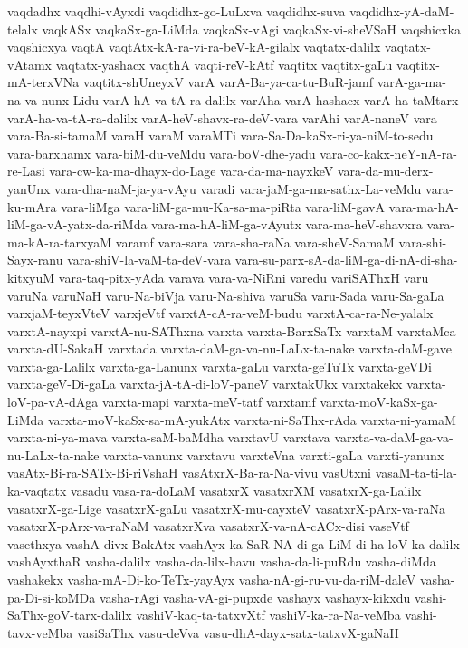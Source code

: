 {vaqdadhx
vaqdhi-vAyxdi
vaqdidhx-go-LuLxva
vaqdidhx-suva
vaqdidhx-yA-daM-telalx
vaqkASx
vaqkaSx-ga-LiMda
vaqkaSx-vAgi
vaqkaSx-vi-sheVSaH
vaqshicxka
vaqshicxya
vaqtA
vaqtAtx-kA-ra-vi-ra-beV-kA-gilalx
vaqtatx-dalilx
vaqtatx-vAtamx
vaqtatx-yashacx
vaqthA
vaqti-reV-kAtf
vaqtitx
vaqtitx-gaLu
vaqtitx-mA-terxVNa
vaqtitx-shUneyxV
varA
varA-Ba-ya-ca-tu-BuR-jamf
varA-ga-ma-na-va-nunx-Lidu
varA-hA-va-tA-ra-dalilx
varAha
varA-hashacx
varA-ha-taMtarx
varA-ha-va-tA-ra-dalilx
varA-heV-shavx-ra-deV-vara
varAhi
varA-naneV
vara
vara-Ba-si-tamaM
varaH
varaM
varaMTi
vara-Sa-Da-kaSx-ri-ya-niM-to-sedu
vara-barxhamx
vara-biM-du-veMdu
vara-boV-dhe-yadu
vara-co-kakx-neY-nA-ra-re-Lasi
vara-cw-ka-ma-dhayx-do-Lage
vara-da-ma-nayxkeV
vara-da-mu-derx-yanUnx
vara-dha-naM-ja-ya-vAyu
varadi
vara-jaM-ga-ma-sathx-La-veMdu
vara-ku-mAra
vara-liMga
vara-liM-ga-mu-Ka-sa-ma-piRta
vara-liM-gavA
vara-ma-hA-liM-ga-vA-yatx-da-riMda
vara-ma-hA-liM-ga-vAyutx
vara-ma-heV-shavxra
vara-ma-kA-ra-tarxyaM
varamf
vara-sara
vara-sha-raNa
vara-sheV-SamaM
vara-shi-Sayx-ranu
vara-shiV-la-vaM-ta-deV-vara
vara-su-parx-sA-da-liM-ga-di-nA-di-sha-kitxyuM
vara-taq-pitx-yAda
varava
vara-va-NiRni
varedu
variSAThxH
varu
varuNa
varuNaH
varu-Na-biVja
varu-Na-shiva
varuSa
varu-Sada
varu-Sa-gaLa
varxjaM-teyxVteV
varxjeVtf
varxtA-cA-ra-veM-budu
varxtA-ca-ra-Ne-yalalx
varxtA-nayxpi
varxtA-nu-SAThxna
varxta
varxta-BarxSaTx
varxtaM
varxtaMca
varxta-dU-SakaH
varxtada
varxta-daM-ga-va-nu-LaLx-ta-nake
varxta-daM-gave
varxta-ga-Lalilx
varxta-ga-Lanunx
varxta-gaLu
varxta-geTuTx
varxta-geVDi
varxta-geV-Di-gaLa
varxta-jA-tA-di-loV-paneV
varxtakUkx
varxtakekx
varxta-loV-pa-vA-dAga
varxta-mapi
varxta-meV-tatf
varxtamf
varxta-moV-kaSx-ga-LiMda
varxta-moV-kaSx-sa-mA-yukAtx
varxta-ni-SaThx-rAda
varxta-ni-yamaM
varxta-ni-ya-mava
varxta-saM-baMdha
varxtavU
varxtava
varxta-va-daM-ga-va-nu-LaLx-ta-nake
varxta-vanunx
varxtavu
varxteVna
varxti-gaLa
varxti-yanunx
vasAtx-Bi-ra-SATx-Bi-riVshaH
vasAtxrX-Ba-ra-Na-vivu
vasUtxni
vasaM-ta-ti-la-ka-vaqtatx
vasadu
vasa-ra-doLaM
vasatxrX
vasatxrXM
vasatxrX-ga-Lalilx
vasatxrX-ga-Lige
vasatxrX-gaLu
vasatxrX-mu-cayxteV
vasatxrX-pArx-va-raNa
vasatxrX-pArx-va-raNaM
vasatxrXva
vasatxrX-va-nA-cACx-disi
vaseVtf
vasethxya
vashA-divx-BakAtx
vashAyx-ka-SaR-NA-di-ga-LiM-di-ha-loV-ka-dalilx
vashAyxthaR
vasha-dalilx
vasha-da-lilx-havu
vasha-da-li-puRdu
vasha-diMda
vashakekx
vasha-mA-Di-ko-TeTx-yayAyx
vasha-nA-gi-ru-vu-da-riM-daleV
vasha-pa-Di-si-koMDa
vasha-rAgi
vasha-vA-gi-pupxde
vashayx
vashayx-kikxdu
vashi-SaThx-goV-tarx-dalilx
vashiV-kaq-ta-tatxvXtf
vashiV-ka-ra-Na-veMba
vashi-tavx-veMba
vasiSaThx
vasu-deVva
vasu-dhA-dayx-satx-tatxvX-gaNaH
}
